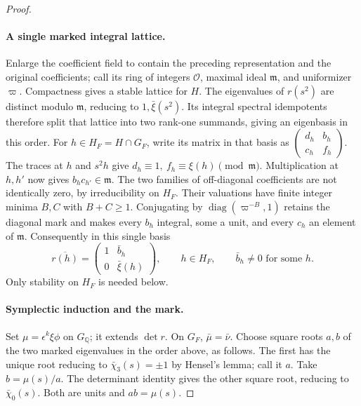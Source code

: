 \begin{proof}
\paragraph{A single marked integral lattice.}
Enlarge the coefficient field to contain the preceding
representation and the original coefficients; call its ring of
integers \(\mathcal O\), maximal ideal \(\mathfrak m\), and
uniformizer \(\varpi\). Compactness gives a stable lattice for
\(H\). The eigenvalues of \(r(s^2)\) are distinct modulo
\(\mathfrak m\), reducing to \(1,\bar\xi(s^2)\). Its integral
spectral idempotents therefore split that lattice into two
rank-one summands, giving an eigenbasis in this order. For
\(h\in H_F=H\cap G_F\), write its matrix in that basis as
\(\left(\begin{smallmatrix}d_h&b_h\\c_h&f_h\end{smallmatrix}\right)\).
The traces at \(h\) and \(s^2h\) give
\(d_h\equiv1,\ f_h\equiv\xi(h)\pmod{\mathfrak m}\).
Multiplication at \(h,h'\) now gives
\(b_hc_{h'}\in\mathfrak m\).
The two families of off-diagonal coefficients are not identically
zero, by irreducibility on \(H_F\). Their valuations have finite
integer minima \(B,C\) with \(B+C\ge1\).
Conjugating by \(\operatorname{diag}(\varpi^{-B},1)\)
retains the diagonal mark and makes every \(b_h\) integral,
some a unit, and every \(c_h\) an element of \(\mathfrak m\).
Consequently in this single basis
\[
 \overline{r(h)}=\begin{pmatrix}1&\bar b_h\\0&\bar\xi(h)\end{pmatrix},
 \qquad h\in H_F,\qquad \bar b_h\ne0\text{ for some }h.
\]
Only stability on \(H_F\) is needed below.

\paragraph{Symplectic induction and the mark.}
Set \(\mu=\epsilon^k\xi\phi\) on \(G_{\mathbb Q}\); it extends
\(\det r\). On \(G_F\), \(\bar\mu=\bar\nu\).
Choose square roots \(a,b\) of the two marked eigenvalues in the
order above, as follows. The first has the unique root reducing
to \(\bar\chi_3(s)=\pm1\) by Hensel's lemma; call it \(a\).
Take \(b=\mu(s)/a\). The determinant identity gives the other
square root, reducing to \(\bar\chi_0(s)\).
Both are units and \(ab=\mu(s)\).


\end{proof}

